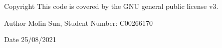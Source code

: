 \begin{DoxyCopyright}{Copyright}
This code is covered by the G\+NU general public license v3. 
\end{DoxyCopyright}
\begin{DoxyAuthor}{Author}
Molin Sun, Student Number\+: C00266170 
\end{DoxyAuthor}
\begin{DoxyDate}{Date}
25/08/2021 
\end{DoxyDate}
